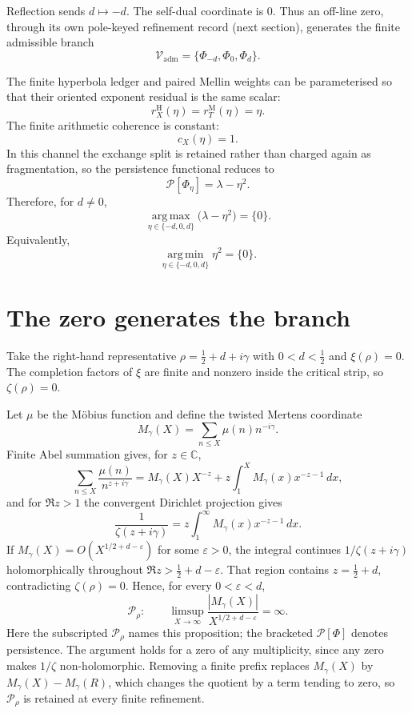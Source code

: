\documentclass[11pt]{article}
\newcommand{\Pheart}{\mathcal P}
\newcommand{\argmax}{\operatorname*{arg\,max}}
\newcommand{\argmin}{\operatorname*{arg\,min}}
\begin{document}
Reflection sends \(d\mapsto-d\). The self-dual coordinate is \(0\). Thus an off-line zero, through its own pole-keyed refinement record (next section), generates the finite admissible branch
\[
\mathcal V_{\mathrm{adm}}
=
\{\Phi_{-d},\Phi_0,\Phi_d\}.
\]

The finite hyperbola ledger and paired Mellin weights can be parameterised so that their oriented exponent residual is the same scalar:
\[
r_X^{\mathrm H}(\eta)
=
r_T^{\mathrm M}(\eta)
=
\eta.
\]
The finite arithmetic coherence is constant:
\[
c_X(\eta)=1.
\]
In this channel the exchange split is retained rather than charged again as fragmentation, so the persistence functional reduces to
\[
\Pheart[\Phi_\eta]
=
\lambda-\eta^2.
\]
Therefore, for \(d\neq0\),
\[
\argmax_{\eta\in\{-d,0,d\}}
\bigl(\lambda-\eta^2\bigr)
=
\{0\}.
\]
Equivalently,
\[
\argmin_{\eta\in\{-d,0,d\}}\eta^2=\{0\}.
\]

\section{The zero generates the branch}

Take the right-hand representative \(\rho=\frac12+d+i\gamma\) with \(0<d<\frac12\) and \(\xi(\rho)=0\). The completion factors of \(\xi\) are finite and nonzero inside the critical strip, so \(\zeta(\rho)=0\).

Let \(\mu\) be the M\"obius function and define the twisted Mertens coordinate
\[
M_\gamma(X)=\sum_{n\le X}\mu(n)n^{-i\gamma}.
\]
Finite Abel summation gives, for \(z\in\mathbb C\),
\[
\sum_{n\le X}\frac{\mu(n)}{n^{z+i\gamma}}
=
M_\gamma(X)X^{-z}
+
z\int_1^X M_\gamma(x)x^{-z-1}\,dx,
\]
and for \(\Re z>1\) the convergent Dirichlet projection gives
\[
\frac1{\zeta(z+i\gamma)}
=
z\int_1^\infty M_\gamma(x)x^{-z-1}\,dx.
\]
If \(M_\gamma(X)=O\!\left(X^{1/2+d-\varepsilon}\right)\) for some \(\varepsilon>0\), the integral continues \(1/\zeta(z+i\gamma)\) holomorphically throughout \(\Re z>\frac12+d-\varepsilon\). That region contains \(z=\frac12+d\), contradicting \(\zeta(\rho)=0\). Hence, for every \(0<\varepsilon<d\),
\[
\mathcal P_\rho:
\qquad
\limsup_{X\to\infty}
\frac{|M_\gamma(X)|}{X^{1/2+d-\varepsilon}}
=
\infty.
\]
Here the subscripted \(\mathcal P_\rho\) names this proposition; the bracketed \(\Pheart[\Phi]\) denotes persistence. The argument holds for a zero of any multiplicity, since any zero makes \(1/\zeta\) non-holomorphic. Removing a finite prefix replaces \(M_\gamma(X)\) by \(M_\gamma(X)-M_\gamma(R)\), which changes the quotient by a term tending to zero, so \(\mathcal P_\rho\) is retained at every finite refinement.
\end{document}

